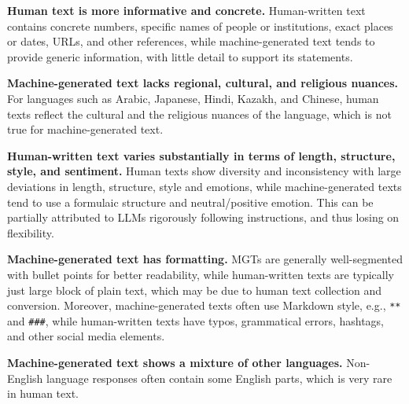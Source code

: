 \begin{compactitem}
    \item \textbf{Human text is more informative and concrete.}
    Human-written text contains concrete numbers, specific names of people or institutions, exact places or dates, URLs, and other references, while machine-generated text tends to provide generic information, with little detail to support its statements. 
    
    \item \textbf{Machine-generated text lacks regional, cultural, and religious nuances.}
    For languages such as Arabic, Japanese, Hindi, Kazakh, and Chinese, human texts reflect the cultural and the religious nuances of the language, which is not true for machine-generated text.

    \item \textbf{Human-written text varies substantially in terms of length, structure, style, and sentiment.}
    Human texts show diversity and inconsistency with large deviations in length, structure, style and emotions, while machine-generated texts tend to use a formulaic structure and neutral/positive emotion. This can be partially attributed to LLMs rigorously following instructions, and thus losing on flexibility. 
    

    \item \textbf{Machine-generated text has formatting.}
    MGTs are generally well-segmented with bullet points for better readability, while human-written texts are typically just large block of plain text, which may be due to human text collection and conversion. Moreover, machine-generated texts often use Markdown style, e.g., \texttt{**} and \texttt{\#\#\#}, while human-written texts have typos, grammatical errors, hashtags, and other social media elements.

    \item \textbf{Machine-generated text shows a mixture of other languages.} Non-English language responses often contain some English parts, which is very rare in human text.
\end{compactitem}
